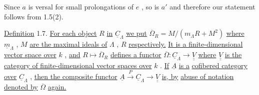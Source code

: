 \begin{center}
\end{center}
Since  $a$  is versal for small prolongations of  $e$  , so is  $a'$ and therefore our statement follows from 1.5(2).

\underline{Definition} 1.7.   \underline{For each object}  $R$  \underline{in}  $\underline{C}_{\Lambda}$ \underline{we put}  $\overline{\Omega}_R = M/(m_{\Lambda}R+M^2)$  \underline{where}  $\underline{m}_{\Lambda}$ , $M$  \underline{are the maximal ideals of}  $\Lambda$ ,  $R$  \underline{respectively.} \underline{It is a finite-dimensional vector space over}  $k$  , \underline{and}  $R \longmapsto \overline{\Omega}_R$  \underline{defines a functor}  $\overline{\Omega} : \underline{C}_{\Lambda} \rightarrow \underline{\underline{V}}$  \underline{where} $\underline{\underline{V}}$  \underline{is the category of finite-dimensional vector spaces over}  $k$  . \underline{If}  $\underline{A}$  \underline{is a} \underline{cofibered category over}  $\underline{C}_{\Lambda}$  , \underline{then the composite functor}  $\underline{A} \xrightarrow{\ P\ } \underline{C}_{\Lambda} \rightarrow \underline{\underline{V}}$  \underline{is, by} \underline{abuse of notation denoted by}  $\overline{\Omega}$  \underline{again.}

